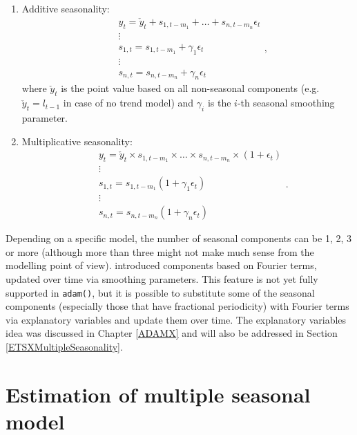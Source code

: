 \documentclass[]{book}
\theoremstyle{definition}
\theoremstyle{definition}
\theoremstyle{definition}
\theoremstyle{definition}
\theoremstyle{remark}
\begin{document}
\begin{enumerate}
\def\labelenumi{\arabic{enumi}.}
\item
  Additive seasonality:
  \begin{equation}
    \begin{aligned}
   & {y}_{t} = \check{y}_t + s_{1,t-m_1} + \dots + s_{n,t-m_n} \epsilon_t \\
   & \vdots \\
   & s_{1,t} = s_{1,t-m_1} + \gamma_1 \epsilon_t \\
   & \vdots \\
   & s_{n,t} = s_{n,t-m_n} + \gamma_n \epsilon_t
    \end{aligned},
    \label{eq:ETSADAMAdditiveSeasonality}
  \end{equation}
  where \(\check{y}_t\) is the point value based on all non-seasonal components (e.g.~\(\check{y}_t=l_{t-1}\) in case of no trend model) and \(\gamma_i\) is the \(i\)-th seasonal smoothing parameter.
\item
  Multiplicative seasonality:
  \begin{equation}
    \begin{aligned}
   & {y}_{t} = \check{y}_t \times s_{1,t-m_1} \times \dots \times s_{n,t-m_n} \times(1+\epsilon_t) \\
   & \vdots \\
   & s_{1,t} = s_{1,t-m_1} (1 + \gamma_1 \epsilon_t) \\
   & \vdots \\
   & s_{n,t} = s_{n,t-m_n} (1+ \gamma_n \epsilon_t)
    \end{aligned}.
  \label{eq:ETSADAMMultiplicativeSeasonality}
  \end{equation}
\end{enumerate}

Depending on a specific model, the number of seasonal components can be 1, 2, 3 or more (although more than three might not make much sense from the modelling point of view). \citet{DeLivera2010} introduced components based on Fourier terms, updated over time via smoothing parameters. This feature is not yet fully supported in \texttt{adam()}, but it is possible to substitute some of the seasonal components (especially those that have fractional periodicity) with Fourier terms via explanatory variables and update them over time. The explanatory variables idea was discussed in Chapter \ref{ADAMX} and will also be addressed in Section \ref{ETSXMultipleSeasonality}.

\hypertarget{ADAMMultiplIssues}{%
\section{Estimation of multiple seasonal model}\label{ADAMMultiplIssues}}
\end{document}
